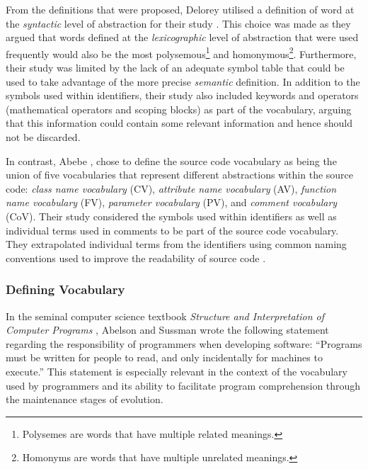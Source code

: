 From the definitions that were proposed, Delorey \etal utilised a definition of word at the \emph{syntactic} level of abstraction for their study \cite{Delorey09a}. This choice was made as they argued that words defined at the \emph{lexicographic} level of abstraction that were used frequently would also be the most polysemous\footnote{Polysemes are words that have multiple related meanings.} and homonymous\footnote{Homonyms are words that have multiple unrelated meanings.}. Furthermore, their study was limited by the lack of an adequate symbol table that could be used to take advantage of the more precise \emph{semantic} definition. In addition to the symbols used within identifiers, their study also included keywords and operators (\eg mathematical operators and scoping blocks) as part of the vocabulary, arguing that this information could contain some relevant information and hence should not be discarded.

In contrast, Abebe \etal \cite{Abebe09a}, chose to define the source code vocabulary as being the union of five vocabularies that represent different abstractions within the source code: \emph{class name vocabulary} (CV), \emph{attribute name vocabulary} (AV), \emph{function name vocabulary} (FV), \emph{parameter vocabulary} (PV), and \emph{comment vocabulary} (CoV). Their study considered the symbols used within identifiers as well as individual terms used in comments to be part of the source code vocabulary. They extrapolated individual terms from the identifiers using common naming conventions used to improve the readability of source code \cite{Reddy00a}.


\subsubsection{Defining Vocabulary} %
\label{ssub:defining_vocabulary}

In the seminal computer science textbook \emph{Structure and Interpretation of Computer Programs} \cite{Abelson96a}, Abelson and Sussman wrote the following statement regarding the responsibility of programmers when developing software: ``Programs must be written for people to read, and only incidentally for machines to execute.'' This statement is especially relevant in the context of the vocabulary used by programmers and its ability to facilitate program comprehension through the maintenance stages of evolution.

